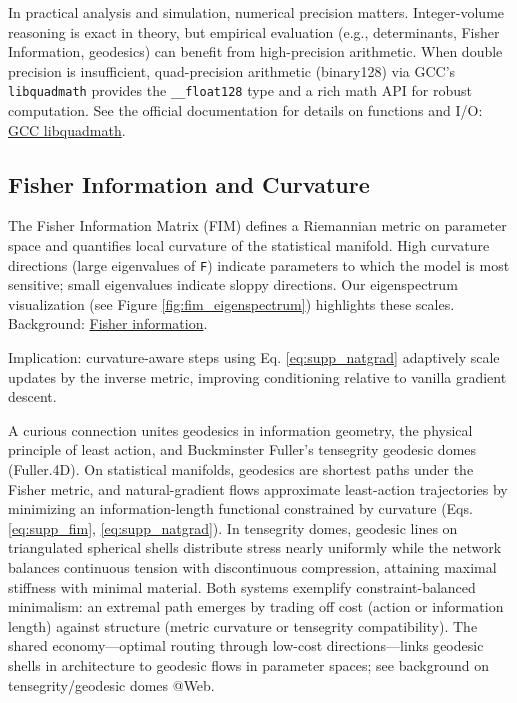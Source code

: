 \documentclass[
  10pt,
]{article}
\begin{document}
In practical analysis and simulation, numerical precision matters.
Integer-volume reasoning is exact in theory, but empirical evaluation
(e.g., determinants, Fisher Information, geodesics) can benefit from
high-precision arithmetic. When double precision is insufficient,
quad-precision arithmetic (binary128) via GCC's \texttt{libquadmath}
provides the \texttt{\_\_float128} type and a rich math API for robust
computation. See the official documentation for details on functions and
I/O: \href{https://gcc.gnu.org/onlinedocs/libquadmath/index.html}{GCC
libquadmath}.

\hypertarget{fisher-information-and-curvature}{%
\subsection{Fisher Information and
Curvature}\label{fisher-information-and-curvature}}

The Fisher Information Matrix (FIM) defines a Riemannian metric on
parameter space and quantifies local curvature of the statistical
manifold. High curvature directions (large eigenvalues of \texttt{F})
indicate parameters to which the model is most sensitive; small
eigenvalues indicate sloppy directions. Our eigenspectrum visualization
(see Figure \ref{fig:fim_eigenspectrum}) highlights these scales.
Background:
\href{https://en.wikipedia.org/wiki/Fisher_information}{Fisher
information}.

Implication: curvature-aware steps using Eq. \eqref{eq:supp_natgrad}
adaptively scale updates by the inverse metric, improving conditioning
relative to vanilla gradient descent.

A curious connection unites geodesics in information geometry, the
physical principle of least action, and Buckminster Fuller's tensegrity
geodesic domes (Fuller.4D). On statistical manifolds, geodesics are
shortest paths under the Fisher metric, and natural-gradient flows
approximate least-action trajectories by minimizing an
information-length functional constrained by curvature (Eqs.
\eqref{eq:supp_fim}, \eqref{eq:supp_natgrad}). In tensegrity domes,
geodesic lines on triangulated spherical shells distribute stress nearly
uniformly while the network balances continuous tension with
discontinuous compression, attaining maximal stiffness with minimal
material. Both systems exemplify constraint-balanced minimalism: an
extremal path emerges by trading off cost (action or information length)
against structure (metric curvature or tensegrity compatibility). The
shared economy---optimal routing through low-cost directions---links
geodesic shells in architecture to geodesic flows in parameter spaces;
see background on tensegrity/geodesic domes @Web.
\end{document}
